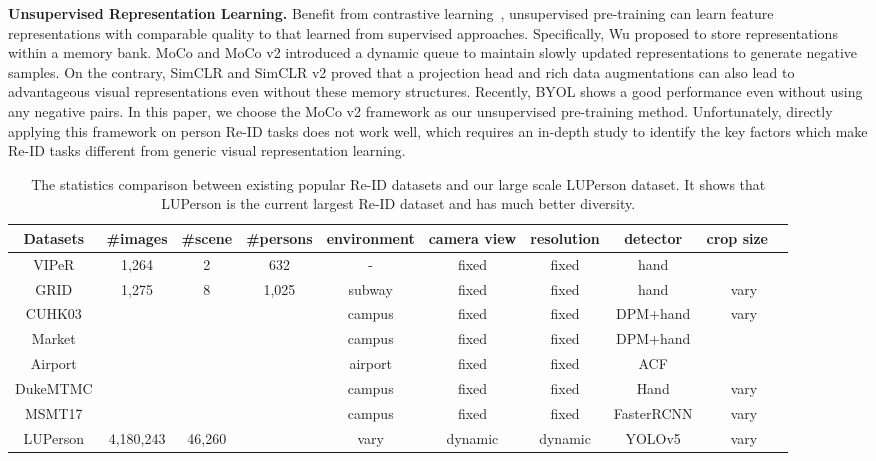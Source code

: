 \documentclass[final]{cvpr}
\begin{document}
\noindent\textbf{Unsupervised Representation Learning.} Benefit from contrastive learning~\cite{wu2018unsupervised, chen2020simple, he2020momentum}, unsupervised pre-training can learn feature representations with comparable quality to that learned from supervised approaches. Specifically, Wu \etal \cite{wu2018unsupervised} proposed to store representations within a memory bank. MoCo and MoCo v2 \cite{he2020momentum,chen2020improved} introduced a dynamic queue to maintain slowly updated representations to generate negative samples. On the contrary, SimCLR and SimCLR v2 \cite{chen2020simple,chen2020big} proved that a projection head and rich data augmentations can also lead to advantageous visual representations even without these memory structures. 
Recently, BYOL \cite{grill2020bootstrap} shows a good performance even without using any negative pairs. In this paper, we choose the MoCo v2 \cite{chen2020mocov2} framework as our unsupervised pre-training method. Unfortunately, directly applying this framework on person Re-ID tasks does not work well, which requires an in-depth study to identify the key factors which make Re-ID tasks different from generic visual representation learning.

\begin{table*}[t]
\setlength{\tabcolsep}{1.3mm}
    \centering
    \begin{tabular}{c|c|c|c|c|c|c|c|c}
    \hline
        Datasets & \#images & \#scene & \#persons & environment & camera view & resolution & detector & crop size \ \\
        \hline
        \hline
        VIPeR\cite{gray2008viewpoint} & 1,264 & 2 & 632 & - & fixed & fixed & hand &  \\
        GRID\cite{loy2013person} & 1,275 & 8 & 1,025 & subway & fixed & fixed & hand & vary \\
        CUHK03\cite{li2014deepreid} &  &  &  & campus & fixed & fixed & DPM\cite{felzenszwalb2009object}+hand & vary\\
        Market\cite{Zheng2015ScalablePR} &  &  &  & campus & fixed & fixed & DPM\cite{felzenszwalb2009object}+hand &  \\
        Airport\cite{karanam2016comprehensive} &  &  &  & airport & fixed & fixed & ACF\cite{dollar2014fast} &  \\
        DukeMTMC\cite{zheng2017unlabeled} &  &  &  & campus & fixed & fixed & Hand &  vary \\
        MSMT17\cite{wei2018person} &  &  &  & campus & fixed & fixed & FasterRCNN\cite{ren2015faster} & vary \\
        \hline
        LUPerson & 4,180,243 & 46,260 &  & vary & dynamic & dynamic & YOLOv5 & vary \\
        \hline
    \end{tabular}
    \vspace{-0.5em}
    \caption{The statistics comparison between existing popular Re-ID datasets and our large scale LUPerson dataset. It shows that LUPerson is the current largest Re-ID dataset and has much better diversity.}
    \label{tab:data-stat}
\end{table*}
\end{document}

